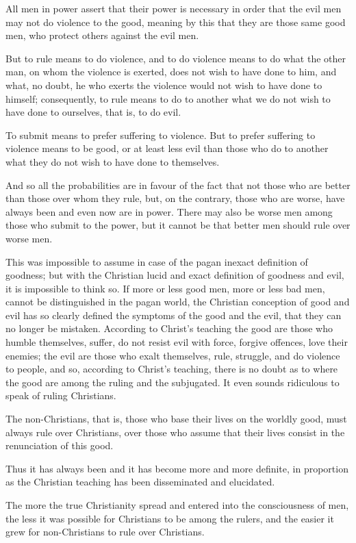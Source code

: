 \documentclass{book}
\begin{document}
All men in power assert that their power is necessary in order that the evil men may not do violence to the good, meaning by this that they are those same good men, who protect others against the evil men.

But to rule means to do violence, and to do violence means to do what the other man, on whom the violence is exerted, does not wish to have done to him, and what, no doubt, he who exerts the violence would not wish to have done to himself; consequently, to rule means to do to another what we do not wish to have done to ourselves, that is, to do evil.

To submit means to prefer suffering to violence. But to prefer suffering to violence means to be good, or at least less evil than those who do to another what they do not wish to have done to themselves.

And so all the probabilities are in favour of the fact that not those who are better than those over whom they rule, but, on the contrary, those who are worse, have always been and even now are in power. There may also be worse men among those who submit to the power, but it cannot be that better men should rule over worse men.

This was impossible to assume in case of the pagan inexact definition of goodness; but with the Christian lucid and exact definition of goodness and evil, it is impossible to think so. If more or less good men, more or less bad men, cannot be distinguished in the pagan world, the Christian conception of good and evil has so clearly defined the symptoms of the good and the evil, that they can no longer be mistaken. According to Christ’s teaching the good are those who humble themselves, suffer, do not resist evil with force, forgive offences, love their enemies; the evil are those who exalt themselves, rule, struggle, and do violence to people, and so, according to Christ’s teaching, there is no doubt as to where the good are among the ruling and the subjugated. It even sounds ridiculous to speak of ruling Christians.

The non-Christians, that is, those who base their lives on the worldly good, must always rule over Christians, over those who assume that their lives consist in the renunciation of this good.

Thus it has always been and it has become more and more definite, in proportion as the Christian teaching has been disseminated and elucidated.

The more the true Christianity spread and entered into the consciousness of men, the less it was possible for Christians to be among the rulers, and the easier it grew for non-Christians to rule over Christians.
\end{document}
